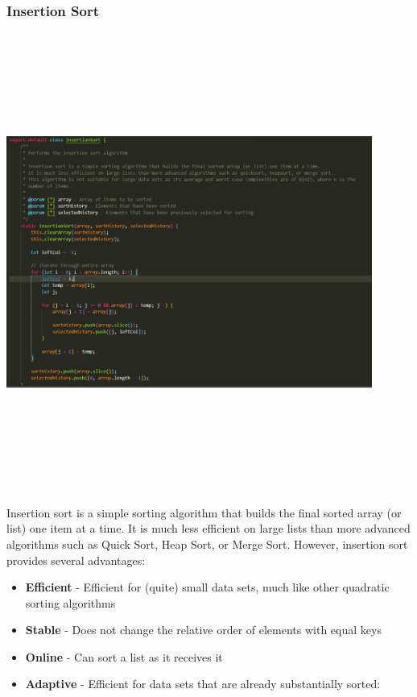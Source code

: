 \subsubsection{Insertion Sort}
\begin{center}
    \includegraphics[width=12cm,height=15cm,keepaspectratio]{images/insertionsort}
\end{center}
Insertion sort is a simple sorting algorithm that builds the final sorted array (or list) one item at a time. It is much less efficient on large lists than more advanced algorithms such as Quick Sort, Heap Sort, or Merge Sort. However, insertion sort provides several advantages:

\begin{itemize}
    \item \textbf{Efficient} - Efficient for (quite) small data sets, much like other quadratic sorting algorithms
    \item \textbf{Stable} - Does not change the relative order of elements with equal keys
    \item \textbf{Online} - Can sort a list as it receives it
    \item \textbf{Adaptive} - Efficient for data sets that are already substantially sorted:
\end{itemize}

